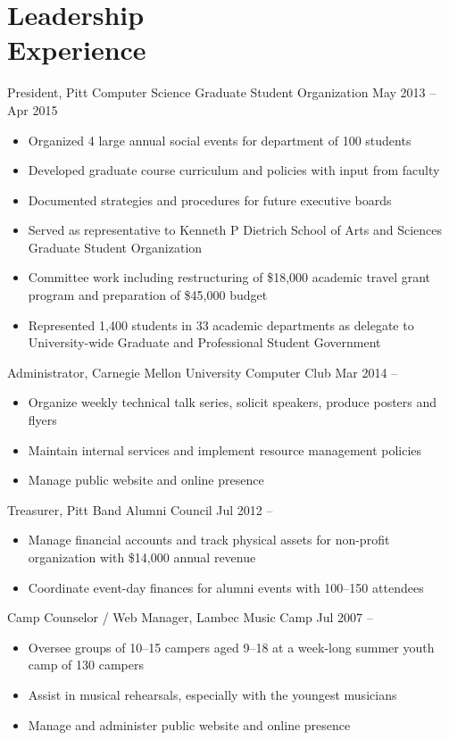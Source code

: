 \documentclass[11pt]{article}
\newcommand{\present}{\phantom{Xxx 20XX}}
\begin{document}
\section{Leadership\\ Experience}

\selectfont
President, Pitt Computer Science Graduate Student Organization
	\hfill May 2013 -- Apr 2015
\normalfont
\begin{itemize}
	\item Organized 4 large annual social events for department of 100 students
	\item Developed graduate course curriculum and policies with input from faculty
	\item Documented strategies and procedures for future executive boards
	\item Served as representative to Kenneth P Dietrich School of Arts and Sciences
		Graduate Student Organization
	\item Committee work including restructuring of \$18,000 academic travel grant program
		and preparation of \$45,000 budget
	\item Represented 1,400 students in 33 academic departments as delegate to
		University-wide Graduate and Professional Student Government
\end{itemize}

\selectfont
Administrator, Carnegie Mellon University Computer Club
	\hfill Mar 2014 -- \present
\normalfont
\begin{itemize}
	\item Organize weekly technical talk series, solicit speakers, produce posters and flyers
	\item Maintain internal services and implement resource management policies
	\item Manage public website and online presence
\end{itemize}

\selectfont
Treasurer, Pitt Band Alumni Council
	\hfill Jul 2012 -- \present
\normalfont
\begin{itemize}
	\item Manage financial accounts and track physical assets
		for non-profit organization with \$14,000 annual revenue
	\item Coordinate event-day finances for alumni events with 100--150 attendees
\end{itemize}

\selectfont
Camp Counselor / Web Manager, Lambec Music Camp
	\hfill Jul 2007 -- \present
\normalfont
\begin{itemize}
	\item Oversee groups of 10--15 campers aged 9--18 at a week-long summer youth camp of 130 campers
	\item Assist in musical rehearsals, especially with the youngest musicians
	\item Manage and administer public website and online presence
\end{itemize}
\end{document}
